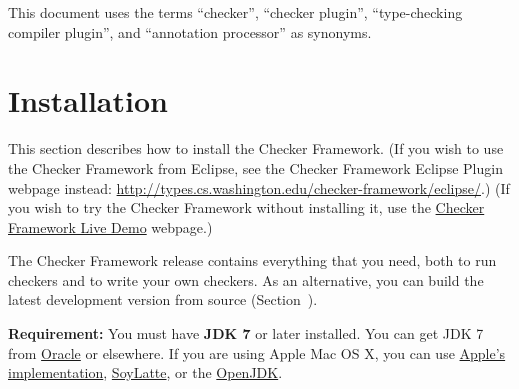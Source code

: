 





This document uses the terms ``checker'', ``checker plugin'',
``type-checking compiler plugin'', and ``annotation processor'' as
synonyms.

\section{Installation\label{installation}}

\begin{sloppypar}
This section describes how to install the Checker Framework.
(If you wish to use the Checker Framework from Eclipse, see the Checker
Framework Eclipse Plugin webpage instead:
\url{http://types.cs.washington.edu/checker-framework/eclipse/}.)
(If you wish to try the Checker Framework without installing it, use the
\href{http://eisop.uwaterloo.ca/live/}{Checker Framework Live Demo} webpage.)
\end{sloppypar}

The Checker Framework release contains everything that you need, both to
run checkers and to write your own checkers.  As an alternative, you can
build the latest development version from source
(Section~).

\textbf{Requirement:}
You must have \textbf{JDK 7} or later installed.  You can get JDK 7 from
\href{http://www.oracle.com/technetwork/java/javase/downloads/index.html}{Oracle}
or elsewhere.  If you are using Apple Mac OS X, you can use
\href{https://developer.apple.com/search/index.php?q=java}{Apple's implementation},
\href{http://landonf.bikemonkey.org/static/soylatte/}{SoyLatte},
or the \href{http://openjdk.java.net/}{OpenJDK}.

